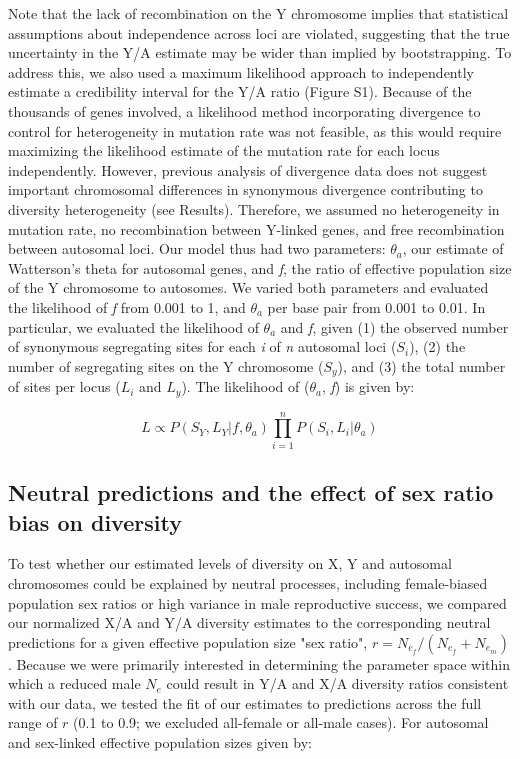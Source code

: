 \documentclass[9pt,twocolumn,twoside]{gsajnl}
\begin{document}
Note that the lack of recombination on the Y chromosome implies that statistical assumptions about independence across loci are violated, suggesting that the true uncertainty in the Y/A estimate may be wider than implied by bootstrapping. To address this, we also used a maximum likelihood approach to independently estimate a credibility interval for the Y/A ratio (Figure S1). Because of the thousands of genes involved, a likelihood method incorporating divergence to control for heterogeneity in mutation rate was not feasible, as this would require maximizing the likelihood estimate of the mutation rate for each locus independently. However, previous analysis of divergence data does not suggest important chromosomal differences in synonymous divergence contributing to diversity heterogeneity (see Results). Therefore, we assumed no heterogeneity in mutation rate, no recombination between Y-linked genes, and free recombination between autosomal loci. Our model thus had two parameters: $\theta_{a}$, our estimate of Watterson's theta for autosomal genes, and \textit{f}, the ratio of effective population size of the Y chromosome to autosomes. We varied both parameters and evaluated the likelihood of \textit{f} from 0.001 to 1, and $\theta_{a}$ per base pair from 0.001 to 0.01. In particular, we evaluated the likelihood of $\theta_{a}$ and \textit{f}, given (1) the observed number of synonymous segregating sites for each \textit{i} of \textit{n} autosomal loci ($S_{i}$), (2) the number of segregating sites on the Y chromosome ($S_{y}$), and (3) the total number of sites per locus ($L_{i}$ and $L_{y}$). The likelihood of ($\theta_{a}$, \textit{f}) is given by:

\begin{equation}
L \propto  P(S_{Y}, L_{Y} | f, \theta_{a})\prod_{i=1}^{n}P(S_{i}, L_{i} | \theta_{a})  \label{eq:L}
\end{equation}

\subsection*{Neutral predictions and the effect of sex ratio bias on diversity}
To test whether our estimated levels of diversity on X, Y and autosomal chromosomes could be explained by neutral processes, including female-biased population sex ratios or high variance in male reproductive success, we compared our normalized X/A and Y/A diversity estimates to the corresponding neutral predictions for a given effective population size "sex ratio", $r=N_{e}_{f}/(N_{e}_{f} + N_{e}_{m})$. Because we were primarily interested in determining the parameter space within which a reduced male $N_{e}$ could result in Y/A and X/A diversity ratios consistent with our data, we tested the fit of our estimates to predictions across the full range of $r$ (0.1 to 0.9; we excluded all-female or all-male cases). For autosomal and sex-linked effective population sizes given by:
\end{document}
